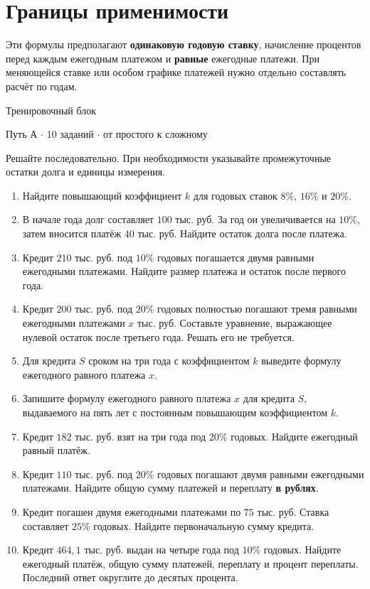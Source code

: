\documentclass[a4paper,12pt]{article}
\begin{document}
\section{Границы применимости}
Эти формулы предполагают \textbf{одинаковую годовую ставку}, начисление процентов перед каждым ежегодным платежом и \textbf{равные} ежегодные платежи. При меняющейся ставке или особом графике платежей нужно отдельно составлять расчёт по годам.

\clearpage
\thispagestyle{plain}
\begin{center}
{\Large\color{darkaccent} Тренировочный блок}\par
\vspace{3pt}
{\small Путь А \(\cdot\) 10 заданий \(\cdot\) от простого к сложному}
\end{center}
\vspace{4mm}
Решайте последовательно. При необходимости указывайте промежуточные остатки долга и единицы измерения.

\begin{enumerate}[itemsep=12pt]
\item Найдите повышающий коэффициент \(k\) для годовых ставок \(8\%\), \(16\%\) и \(20\%\).
\item В начале года долг составляет \(100\) тыс. руб. За год он увеличивается на \(10\%\), затем вносится платёж \(40\) тыс. руб. Найдите остаток долга после платежа.
\item Кредит \(210\) тыс. руб. под \(10\%\) годовых погашается двумя равными ежегодными платежами. Найдите размер платежа и остаток после первого года.
\item Кредит \(200\) тыс. руб. под \(20\%\) годовых полностью погашают тремя равными ежегодными платежами \(x\) тыс. руб. Составьте уравнение, выражающее нулевой остаток после третьего года. Решать его не требуется.
\item Для кредита \(S\) сроком на три года с коэффициентом \(k\) выведите формулу ежегодного равного платежа \(x\).
\item Запишите формулу ежегодного равного платежа \(x\) для кредита \(S\), выдаваемого на пять лет с постоянным повышающим коэффициентом \(k\).
\item Кредит \(182\) тыс. руб. взят на три года под \(20\%\) годовых. Найдите ежегодный равный платёж.
\item Кредит \(110\) тыс. руб. под \(20\%\) годовых погашают двумя равными ежегодными платежами. Найдите общую сумму платежей и переплату \textbf{в рублях}.
\item Кредит погашен двумя ежегодными платежами по \(75\) тыс. руб. Ставка составляет \(25\%\) годовых. Найдите первоначальную сумму кредита.
\item Кредит \(464{,}1\) тыс. руб. выдан на четыре года под \(10\%\) годовых. Найдите ежегодный платёж, общую сумму платежей, переплату и процент переплаты. Последний ответ округлите до десятых процента.
\end{enumerate}
\end{document}
